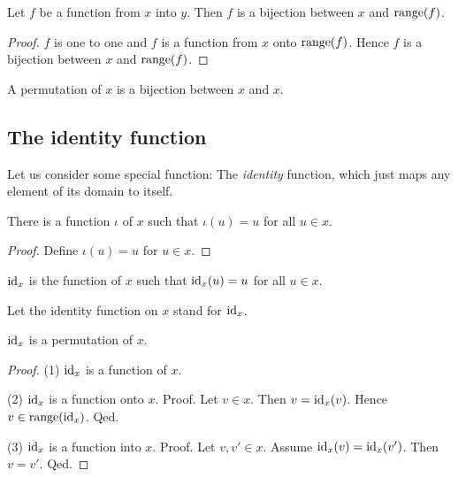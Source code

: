 \documentclass[../../set-theory.ftl.tex]{subfiles}
\begin{document}
\begin{forthel}
    \begin{proposition}\label{SetTheory_02_01_717927}
      Let $f$ be a function from $x$ into $y$.
      Then $f$ is a bijection between $x$ and $\operatorname{range}(f)$.
    \end{proposition}
    \begin{proof}
      $f$ is one to one and $f$ is a function from $x$ onto $\operatorname{range}(f)$.
      Hence $f$ is a bijection between $x$ and $\operatorname{range}(f)$.
    \end{proof}

    \begin{definition}
      A permutation of $x$ is a bijection between $x$ and $x$.
    \end{definition}
  \end{forthel}


  \subsection{The identity function}

  Let us consider some special function:
  The \textit{identity} function, which just maps any element of its domain to
  itself.

  \begin{forthel}
    \begin{lemma}
      There is a function $\iota$ of $x$ such that $\iota(u) = u$ for all $u \in x$.
    \end{lemma}
    \begin{proof}
      Define $\iota(u) = u$ for $u \in x$.
    \end{proof}

    \begin{definition}
      $\operatorname{id}_{x}$ is the function of $x$ such that $\operatorname{id}_{x}(u) = u$ for all $u \in x$.
    \end{definition}

    Let the identity function on $x$ stand for $\operatorname{id}_{x}$.

    \begin{proposition}\label{SetTheory_02_01_848243}
      $\operatorname{id}_{x}$ is a permutation of $x$.
    \end{proposition}
    \begin{proof}
      (1) $\operatorname{id}_{x}$ is a function of $x$.

      (2) $\operatorname{id}_{x}$ is a function onto $x$.
      Proof.
        Let $v \in x$.
        Then $v = \operatorname{id}_{x}(v)$.
        Hence $v \in \operatorname{range}(\operatorname{id}_{x})$.
      Qed.

      (3) $\operatorname{id}_{x}$ is a function into $x$.
      Proof.
        Let $v,v' \in x$.
        Assume $\operatorname{id}_{x}(v) = \operatorname{id}_{x}(v')$.
        Then $v = v'$.
      Qed.
    \end{proof}
  \end{forthel}
\end{document}
